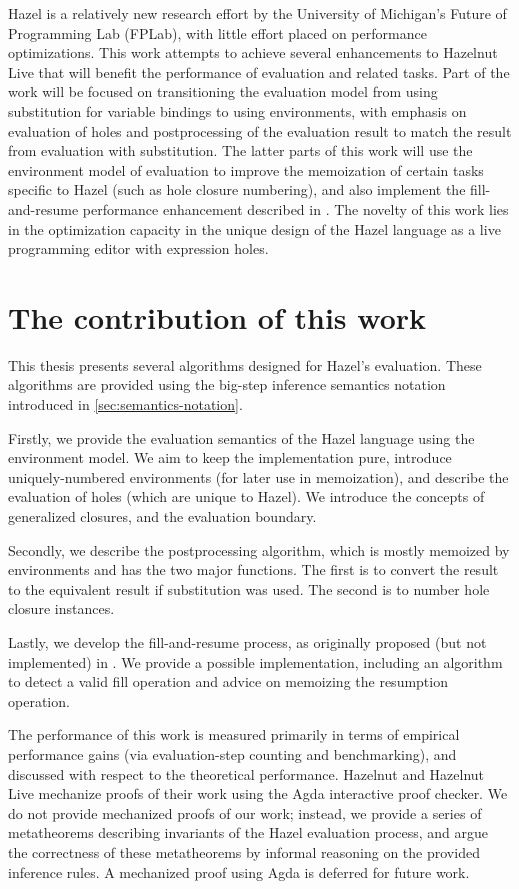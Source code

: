 Hazel is a relatively new research effort by the University of Michigan's Future of Programming Lab (FPLab), with little effort placed on performance optimizations. This work attempts to achieve several enhancements to Hazelnut Live that will benefit the performance of evaluation and related tasks. Part of the work will be focused on transitioning the evaluation model from using substitution for variable bindings to using environments, with emphasis on evaluation of holes and postprocessing of the evaluation result to match the result from evaluation with substitution. The latter parts of this work will use the environment model of evaluation to improve the memoization of certain tasks specific to Hazel (such as hole closure numbering), and also implement the fill-and-resume performance enhancement described in \cite{conf/popl/HazelnutLive19}. The novelty of this work lies in the optimization capacity in the unique design of the Hazel language as a live programming editor with expression holes.

\section{The contribution of this work}
\label{sec:contribution}

This thesis presents several algorithms designed for Hazel's evaluation. These algorithms are provided using the big-step inference semantics notation introduced in \cref{sec:semantics-notation}.

Firstly, we provide the evaluation semantics of the Hazel language using the environment model. We aim to keep the implementation pure, introduce uniquely-numbered environments (for later use in memoization), and describe the evaluation of holes (which are unique to Hazel). We introduce the concepts of generalized closures, and the evaluation boundary.

Secondly, we describe the postprocessing algorithm, which is mostly memoized by environments and has the two major functions. The first is to convert the result to the equivalent result if substitution was used. The second is to number hole closure instances.

Lastly, we develop the fill-and-resume process, as originally proposed (but not implemented) in \cite{conf/popl/HazelnutLive19}. We provide a possible implementation, including an algorithm to detect a valid fill operation and advice on memoizing the resumption operation.

The performance of this work is measured primarily in terms of empirical performance gains (via evaluation-step counting and benchmarking), and discussed with respect to the theoretical performance. Hazelnut \cite{conf/popl/Hazelnut17} and Hazelnut Live \cite{conf/popl/HazelnutLive19} mechanize proofs of their work using the Agda interactive proof checker. We do not provide mechanized proofs of our work; instead, we provide a series of metatheorems describing invariants of the Hazel evaluation process, and argue the correctness of these metatheorems by informal reasoning on the provided inference rules. A mechanized proof using Agda is deferred for future work.

